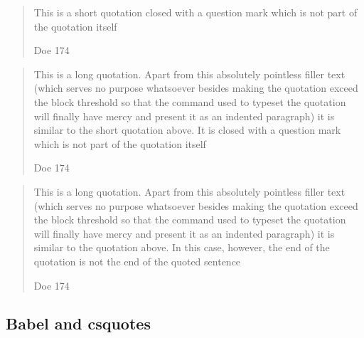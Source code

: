 \documentclass[a4paper]{article}
\newcommand*{\example}[1]{%
  \addvspace{\baselineskip}%
  \par\noindent\hspace{-4em}%
  \makebox[3em][r]{\textbf{Ex. #1}}%
  \hspace{1em}\ignorespaces}
\begin{document}
\renewcommand*{\mkmidblockpunct}[1]{%
  \ifblockquote
    {\ifstringblank{#1}
       {\ifquotepunct{}{.}}
       { [\dots\unkern]\,[#1]}}
    {}}

\renewcommand*{\mkfinblockpunct}[1]{%
  \ifblockquote
    {}
    {\ifstringblank{#1}{.}{#1}}}

\example{4}
\blockquote[Doe 174][?]{This is a short quotation closed with a question mark
which is not part of the quotation itself}

\blockquote[Doe 174][?]{This is a long quotation. Apart from this absolutely
pointless filler text (which serves no purpose whatsoever besides making the
quotation exceed the block threshold so that the command used to typeset the
quotation will finally have mercy and present it as an indented paragraph) it
is similar to the short quotation above. It is closed with a question mark
which is not part of the quotation itself}


\blockquote[Doe 174][.]{This is a long quotation. Apart from this absolutely
pointless filler text (which serves no purpose whatsoever besides making the
quotation exceed the block threshold so that the command used to typeset the
quotation will finally have mercy and present it as an indented paragraph) it
is similar to the quotation above. In this case, however, the end of the
quotation is not the end of the quoted sentence%
}


\renewcommand*{\mkcitation}[1]{ (#1)}
\renewcommand*{\mkmidblockpunct}[1]{}
\renewcommand*{\mkfinblockpunct}[1]{#1}


\subsection{Babel and csquotes}

%
\end{document}
